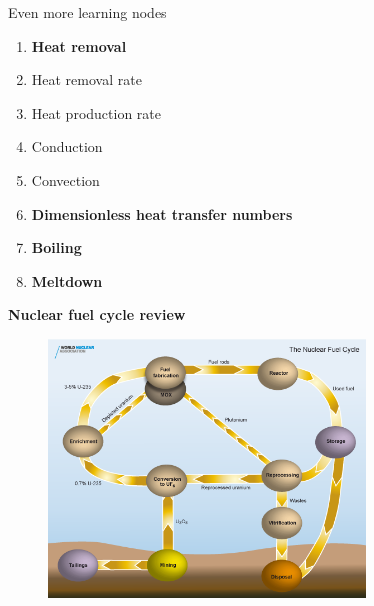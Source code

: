 \documentclass[aspectratio=1610,pdftex,dvipsnames,compress,xcolor={dvipsnames}]{beamer}
\begin{document}
\begin{frame}{Even more learning nodes}
    \begin{enumerate}[series=outerlist,topsep=0pt,itemsep=1pt,leftmargin=*,label=(\arabic*)]
                \item[]\textbf{Heat removal}
                \item[]Heat removal rate
                \item[]Heat production rate
                \item[]Conduction
                \item[]Convection
                    \vspace{0.15in}
                \item[]\textbf{Dimensionless heat transfer numbers}
                    \vspace{0.15in}
                \item[]\textbf{Boiling}
                    \vspace{0.15in}
                \item[]\textbf{Meltdown}
    \end{enumerate}
\end{frame}


\begin{frame}[plain]{}
    \centering\LARGE\textbf{Nuclear fuel cycle review}
\end{frame}


\addtocounter{framenumber}{-1} 
\begin{frame}{}
    \begin{figure}
        \centering
        \includegraphics[width=0.75\textwidth]{nuclear.fuel.cycle1.jpg}
    \end{figure}
\end{frame}
\end{document}
